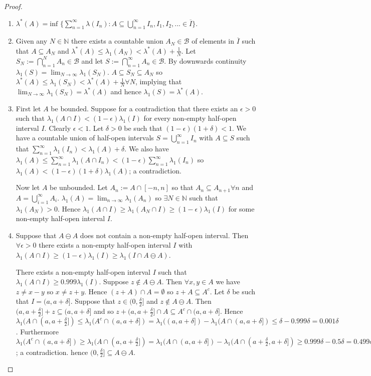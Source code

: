 \documentclass{article}
\begin{document}
\begin{proof}
\begin{enumerate}
    \item $\lambda^*(A)=\text{inf }\{\sum_{n=1}^\infty\lambda(I_n):A\subseteq\bigcup_{n=1}^\infty I_n,I_1,I_2,...\in\overline{I}\}$.
    \item Given any $N\in\mathbb{N}$ there exists a countable union $A_N\in\mathcal{B}$ of elements in $\overline{I}$ such that $A\subseteq A_N$ and $\lambda^*(A)\leq\lambda_1(A_N)<\lambda^*(A)+\frac{1}{N}$. Let $S_N:=\bigcap_{n=1}^N A_n\in\mathcal{B}$ and let $S:=\bigcap_{n=1}^\infty A_n\in\mathcal{B}$. By downwards continuity $\lambda_1(S)=\lim_{N\to\infty}\lambda_1(S_N)$. $A\subseteq S_N\subseteq A_N$ so $\lambda^*(A)\leq\lambda_1(S_N)<\lambda^*(A)+\frac{1}{N}\forall N$, implying that $\lim_{N\to\infty}\lambda_1(S_N)=\lambda^*(A)$ and hence $\lambda_1(S)=\lambda^*(A)$.
    \item First let $A$ be bounded. Suppose for a contradiction that there exists an $\epsilon>0$ such that  $\lambda_1(A\cap I)<(1-\epsilon)\lambda_1(I)$ for every non-empty half-open interval $I$. Clearly $\epsilon<1$. Let $\delta>0$ be such that $(1-\epsilon)(1+\delta)<1$. We have a countable union of half-open intervals $S=\bigcup_{n=1}^\infty I_n$ with $A\subseteq S$ such that $\sum_{n=1}^\infty\lambda_1(I_n)<\lambda_1(A)+\delta$. We also have $\lambda_1(A)\leq\sum_{n=1}^\infty\lambda_1(A\cap I_n)<(1-\epsilon)\sum_{n=1}^\infty\lambda_1(I_n)$ so $\lambda_1(A)<(1-\epsilon)(1+\delta)\lambda_1(A)$; a contradiction.

    Now let $A$ be unbounded. Let $A_n:=A\cap[-n,n]$ so that $A_n\subseteq A_{n+1}\forall n$ and $A=\bigcup_{i=1}^\infty A_i$. $\lambda_1(A)=\lim_{n\to\infty}\lambda_1(A_n)$ so $\exists N\in\mathbb{N}$ such that $\lambda_1(A_N)>0$. Hence $\lambda_1(A\cap I)\geq\lambda_1(A_N\cap I)\geq(1-\epsilon)\lambda_1(I)$ for some non-empty half-open interval $I$.
    \item Suppose that $A\ominus A$ does not contain a non-empty half-open interval. Then $\forall\epsilon>0$ there exists a non-empty half-open interval $I$ with $\lambda_1(A\cap I)\geq(1-\epsilon)\lambda_1(I)\geq\lambda_1(I\cap A\ominus A)$.

    There exists a non-empty half-open interval $I$ such that $\lambda_1(A\cap I)\geq0.999\lambda_1(I)$. Suppose $z\not\in A\ominus A$. Then $\forall x,y\in A$ we have $z\neq x-y$ so $x\neq z+y$. Hence $(z+A)\cap A=\emptyset$ so $z+A\subseteq A^c$. Let $\delta$ be such that $I=(a,a+\delta]$. Suppose that $z\in(0,\frac{\delta}{2}]$ and $z\not\in A\ominus A$. Then $(a,a+\frac{\delta}{2}]+z\subseteq(a,a+\delta]$ and so $z+(a,a+\frac{\delta}{2}]\cap A\subseteq A^c\cap(a,a+\delta]$. Hence $\lambda_1(A\cap(a,a+\frac{\delta}{2}])\leq\lambda_1(A^c\cap(a,a+\delta])=\lambda_1((a,a+\delta])-\lambda_1(A\cap(a,a+\delta])\leq \delta-0.999\delta=0.001\delta$. Furthermore $\lambda_1(A^c\cap(a,a+\delta])\geq\lambda_1(A\cap(a,a+\frac{\delta}{2}])=\lambda_1(A\cap(a,a+\delta])-\lambda_1(A\cap(a+\frac{\delta}{2},a+\delta])\geq0.999\delta-0.5\delta=0.499\delta$; a contradiction. hence $(0,\frac{\delta}{2}]\subseteq A\ominus A$.
\end{enumerate}


\end{proof}
\end{document}
